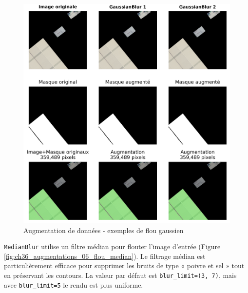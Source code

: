 \begin{figure}[H]
    \centering
    \includegraphics[width=1\linewidth]{02-main/figures/ch3/ch36_augmentations_05_flou_gaussien.png}
    \caption{Augmentation de données - exemples de flou gaussien}
    \label{fig:ch36_augmentations_05_flou_gaussien}
\end{figure}

\newpage

\texttt{MedianBlur} utilise un filtre médian pour flouter l'image d'entrée (Figure \ref{fig:ch36_augmentations_06_flou_median}). Le filtrage médian est particulièrement efficace pour supprimer les bruits de type « poivre et sel » tout en préservant les contours. La valeur par défaut est \texttt{blur\_limit=(3, 7)}, mais avec \texttt{blur\_limit=5} le rendu est plus uniforme.

